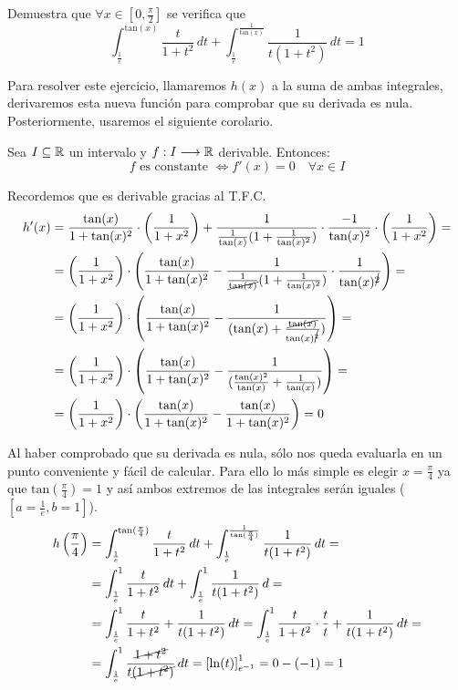 \documentclass[12pt]{article}
\begin{document}
	\begin{ejercicio}[2 puntos]
		Demuestra que $\forall x \in [0, \frac{\pi}{2}]$ se verifica que
		$$ \int_{\frac{1}{e}}^{\text{tan}(x)} \frac{t}{1+t^2}\, dt + \int_{\frac{1}{e}}^{\frac{1}{\text{tan}(x)}} \frac{1}{t(1+t^2)}\, dt = 1$$
		
		Para resolver este ejercicio, llamaremos $h(x)$ a la suma de ambas integrales, derivaremos esta nueva función para comprobar que su derivada es nula. Posteriormente, usaremos el siguiente corolario.
		\begin{coro}
			Sea $I \subseteq \mathbb{R}$ un intervalo y $f:I\longrightarrow \mathbb{R}$ derivable. Entonces:
			$$ f \text{ es constante } \Leftrightarrow f'(x)= 0 \quad \forall x \in I$$
		\end{coro}
		
		Recordemos que es derivable gracias al T.F.C.
		\begin{align*}
			h'(x) &= \frac{\text{tan}(x)}{1+\text{tan}(x)^2}\cdot\left(\frac{1}{1+x^2}\right) + \frac{1}{\frac{1}{\text{tan}(x)}(1+\frac{1}{\text{tan}(x)^2})} \cdot \frac{-1}{\text{tan}(x)^2} \cdot\left(\frac{1}{1+x^2}\right)
			=\\&= \left(\frac{1}{1+x^2}\right)\cdot \left(\frac{\text{tan}(x)}{1+\text{tan}(x)^2} - \frac{1}{\frac{1}{\cancel{\text{tan}(x)}}(1+\frac{1}{\text{tan}(x)^2})} \cdot \frac{1}{\text{tan}(x)^{\cancel{2}}}\right)
			=\\&= \left(\frac{1}{1+x^2}\right)\cdot \left(\frac{\text{tan}(x)}{1+\text{tan}(x)^2} - \frac{1}{(\text{tan}(x)+\frac{\cancel{\text{tan}(x)}}{\text{tan}(x)^{\cancel{2}}})} \right)
			=\\&= \left(\frac{1}{1+x^2}\right)\cdot \left(\frac{\text{tan}(x)}{1+\text{tan}(x)^2} - \frac{1}{(\frac{\text{tan}(x)^2}{\text{tan}(x)}+\frac{1}{\text{tan}(x)})} \right)
			=\\&= \left(\frac{1}{1+x^2}\right)\cdot \left(\frac{\text{tan}(x)}{1+\text{tan}(x)^2} - \frac{\text{tan}(x)}{1+\text{tan}(x)^2} \right) = 0
		\end{align*}
		
		Al haber comprobado que su derivada es nula, sólo nos queda evaluarla en un punto conveniente y fácil de calcular. Para ello lo más simple es elegir $x=\frac{\pi}{4}$ ya que $\text{tan}(\frac{\pi}{4})=1$ y así ambos extremos de las integrales serán iguales ($[a=\frac{1}{e}, b=1]$).
		\begin{align*}
			h\left(\frac{\pi}{4}\right) &= \int_{\frac{1}{e}}^{\text{tan}(\frac{\pi}{4})} \frac{t}{1+t^2}\, dt + \int_{\frac{1}{e}}^{\frac{1}{\text{tan}(\frac{\pi}{4})}} \frac{1}{t(1+t^2)}\, dt
			=\\&= \int_{\frac{1}{e}}^{1} \frac{t}{1+t^2}\, dt + \int_{\frac{1}{e}}^{1} \frac{1}{t(1+t^2)}\, d
			=\\&= \int_{\frac{1}{e}}^{1} \frac{t}{1+t^2} + \frac{1}{t(1+t^2)}\, dt = \int_{\frac{1}{e}}^{1} \frac{t}{1+t^2}\cdot \frac{t}{t} + \frac{1}{t(1+t^2)}\, dt
			=\\&= \int_{\frac{1}{e}}^{1} \frac{\cancel{1+t^2}}{t\cancel{(1+t^2)}}\, dt = \left[\ln(t)\right]^1_{e^{-1}}= 0 - (-1) = 1
		\end{align*}
		

\end{ejercicio}
\end{document}
